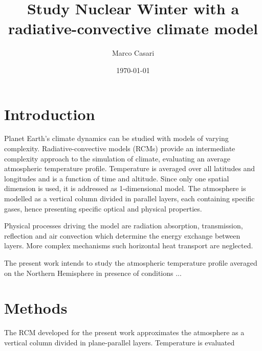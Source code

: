 \documentclass[a4paper,10pt,final,twocolumn]{article}
\begin{document}
\title{Study Nuclear Winter with a radiative-convective climate model} %
\author{Marco Casari}
\date{\today}
\maketitle

\begin{abstract}
\end{abstract}


\section{Introduction}
Planet Earth's climate dynamics can be studied with models of varying complexity. Radiative-convective models (RCMs) provide an intermediate complexity approach to the simulation of climate, evaluating an average atmospheric temperature profile. Temperature is averaged over all latitudes and longitudes and is a function of time and altitude. Since only one spatial dimension is used, it is addressed as 1-dimensional model. The atmosphere is modelled as a vertical column divided in parallel layers, each containing specific gases, hence presenting specific optical and physical properties.

Physical processes driving the model are radiation absorption, transmission, reflection and air convection which determine the energy exchange between layers. More complex mechanisms such horizontal heat transport are neglected.

The present work intends to study the atmospheric temperature profile averaged on the Northern Hemisphere in presence of conditions ...




\section{Methods}
\label{sec:Methods}
The RCM developed for the present work approximates the atmosphere as a vertical column divided in %
plane-parallel layers. Temperature is evaluated %
\end{document}
